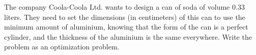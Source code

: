 
The company Coola-Coola Ltd. wants to design a can of soda of volume
0.33 liters. They need to set the dimensions (in centimeters) of this
can to use the minimum amount of aluminium, knowing that the form of the can is a
perfect cylinder, and the thickness of the aluminium is the same
everywhere. Write the problem as an optimization problem.  


